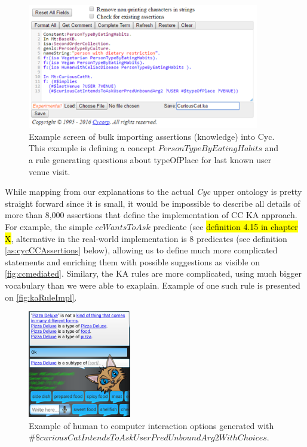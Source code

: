 \begin{figure}[H]
	\centering
		\includegraphics[width=0.9\textwidth]{figures/keEntry.png}
	\caption{Example screen of bulk importing assertions (knowledge) into Cyc.
This example is defining a concept $PersonTypeByEatingHabits$ and a rule 
generating questions about typeOfPlace for last known user venue visit.}
	\label{fig:ketext}
\end{figure}

While mapping from our explanations to the actual \emph{Cyc} upper ontology is 
pretty straight forward since it is small, it would be impossible to describe
all details of more than 8,000 assertions that define the implementation of
CC KA approach. For example, the simple $ccWantsToAsk$ predicate (see
\hl{definition 4.15 in chapter X}, alternative in the real-world implementation
is 8 predicates (see definition \ref{as:cycCCAssertions} below), allowing us to define much more complicated statements and
enriching them with possible suggestions as visible on \autoref{fig:ccmediated}.
Similary, the KA rules are more complicated, using much bigger vocabulary
than we were able to exaplain. Example of one such rule is presented on
\autoref{fig:kaRuleImpl}.

\begin{figure}[h]
	\centering
		\includegraphics[width=0.4\textwidth]{figures/androidMediated.png}
	\caption{Example of human to computer interaction options generated with
$\#\$curiousCatIntendsToAskUserPredUnboundArg2WithChoices$.}
	\label{fig:ccmediated}
\end{figure}

